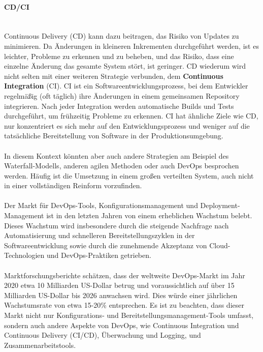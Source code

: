 \documentclass[../vs-script-first-v01.tex]{subfiles}
\begin{document}
\paragraph{CD/CI\\\\}
Continuous Delivery (CD) kann dazu beitragen, das Risiko von Updates zu minimieren. Da Änderungen in kleineren Inkrementen durchgeführt werden, ist es leichter, Probleme zu erkennen und zu beheben, und das Risiko, dass eine einzelne Änderung das gesamte System stört, ist geringer. CD wiederum  wird nicht selten mit einer weiteren Strategie verbunden, dem \textbf{Continuous Integration} (CI). CI ist ein Softwareentwicklungsprozess, bei dem Entwickler regelmäßig (oft täglich) ihre Änderungen in einem gemeinsamen Repository integrieren. Nach jeder Integration werden automatische Builds und Tests durchgeführt, um frühzeitig Probleme zu erkennen. CI hat ähnliche Ziele wie CD, nur konzentriert es sich mehr auf den Entwicklungsprozess und weniger auf die tatsächliche Bereitstellung von Software in der Produktionsumgebung. 
\\\\ 
In diesem Kontext könnten aber auch andere Strategien am Beispiel des Waterfall-Modells, anderen agilen Methoden oder auch DevOps besprochen werden. Häufig ist die Umsetzung in einem großen verteilten System, auch nicht in einer vollständigen Reinform vorzufinden.
\\\\
Der Markt für DevOps-Tools, Konfigurationsmanagement und Deployment-Management ist in den letzten Jahren von einem erheblichen Wachstum belebt. Dieses Wachstum wird insbesondere durch die steigende Nachfrage nach Automatisierung und schnelleren Bereitstellungszyklen in der Softwareentwicklung sowie durch die zunehmende Akzeptanz von Cloud-Technologien und DevOps-Praktiken getrieben.
\\\\
Marktforschungsberichte schätzen, dass der weltweite DevOps-Markt im Jahr 2020 etwa 10 Milliarden US-Dollar betrug und voraussichtlich auf über 15 Milliarden US-Dollar bis 2026 anwachsen wird. Dies würde einer jährlichen Wachstumsrate von etwa 15-20\% entsprechen. Es ist zu beachten, dass dieser Markt nicht nur Konfigurations- und Bereitstellungsmanagement-Tools umfasst, sondern auch andere Aspekte von DevOps, wie Continuous Integration und Continuous Delivery (CI/CD), Überwachung und Logging, und Zusammenarbeitstools.
\\\\
\end{document}
